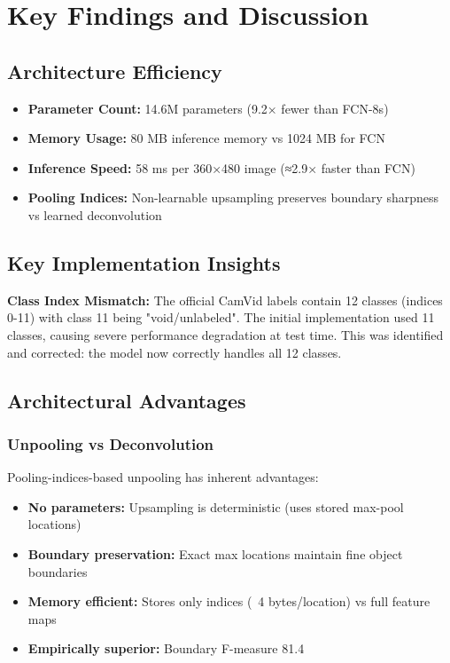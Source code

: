 \documentclass[11pt,a4paper]{report}
\begin{document}
\chapter{Key Findings and Discussion}

\section{Architecture Efficiency}

\begin{itemize}
  \item \textbf{Parameter Count:} 14.6M parameters (9.2× fewer than FCN-8s)
  \item \textbf{Memory Usage:} 80 MB inference memory vs 1024 MB for FCN
  \item \textbf{Inference Speed:} 58 ms per 360×480 image (≈2.9× faster than FCN)
  \item \textbf{Pooling Indices:} Non-learnable upsampling preserves boundary sharpness vs learned deconvolution
\end{itemize}

\section{Key Implementation Insights}

\begin{tcolorbox}[
  colback=yellow!10,
  colframe=orange!50,
  boxrule=0.6pt,
  arc=2pt,
  left=4pt,
  right=4pt,
  top=6pt,
  bottom=6pt,
  breakable=true,
  title=\textbf{Critical Issue Resolved},
  coltitle=black,
  colbacktitle=yellow!10,
]
\textbf{Class Index Mismatch:} The official CamVid labels contain 12 classes (indices 0-11) with class 11 being "void/unlabeled". The initial implementation used 11 classes, causing severe performance degradation at test time. This was identified and corrected: the model now correctly handles all 12 classes.
\end{tcolorbox}

\section{Architectural Advantages}

\subsection*{Unpooling vs Deconvolution}
Pooling-indices-based unpooling has inherent advantages:
\begin{itemize}
  \item \textbf{No parameters:} Upsampling is deterministic (uses stored max-pool locations)
  \item \textbf{Boundary preservation:} Exact max locations maintain fine object boundaries
  \item \textbf{Memory efficient:} Stores only indices (~4 bytes/location) vs full feature maps
  \item \textbf{Empirically superior:} Boundary F-measure 81.4%
\end{itemize}
\end{document}
